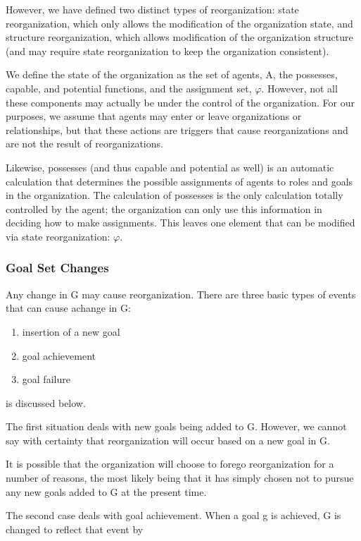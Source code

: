 However, we have defined two distinct types of reorganization: state reorganization, which only allows the modification of the organization state, and structure reorganization, which allows modification  of the organization structure (and may require state reorganization to keep the organization consistent).

We define the state of the organization as the set of agents, A, the possesses, capable, and potential functions, and the assignment set, $\varphi$. However, not all these components may actually be under the control of the organization. For our purposes, we assume that agents may enter or leave organizations or relationships, but that these actions are triggers that cause reorganizations and are not the result of reorganizations. 

Likewise, possesses (and thus capable and potential as well) is an automatic calculation that determines the possible assignments of agents to roles and goals in the organization. The calculation of possesses is the only calculation totally controlled by the agent; the organization can only use this information in deciding how to make assignments. This leaves one element that can be modified via state reorganization: $\varphi$.
	\cite{omacs2}
\subsubsection{ Goal Set Changes }
Any change in G may cause reorganization. There are three basic types 
of events that can cause achange in G: 
\begin{enumerate}
\item   insertion of a new goal  
\item   goal achievement 
\item   goal failure
\end{enumerate}

is discussed below. 

The first situation deals with new goals being added to G. However, \cite{omacs2}
we cannot say with certainty that reorganization will occur based on a new goal in G. 

It is possible that the organization will choose to forego reorganization for a number of reasons, the most likely being that it has simply chosen not to pursue any new goals added to G at the present time.

The second case deals with goal achievement. When a goal g is achieved, G is changed to reflect that event by 

